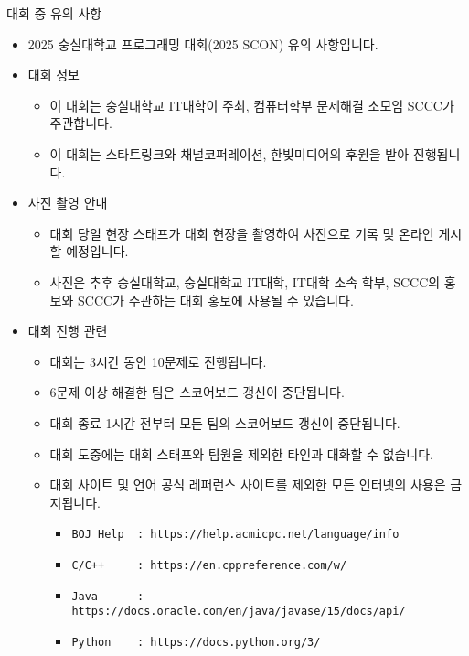 {
    \indent
    \Large
    
    대회 중 유의 사항
}

\begin{itemize}[noitemsep]
    \item 2025 숭실대학교 프로그래밍 대회(2025 SCON) 유의 사항입니다.
    
    \item 대회 정보
    
    \begin{itemize}[noitemsep]
        \item 이 대회는 숭실대학교 IT대학이 주최, 컴퓨터학부 문제해결 소모임 SCCC가 주관합니다.
        \item 이 대회는 스타트링크와 채널코퍼레이션, 한빛미디어의 후원을 받아 진행됩니다.
    \end{itemize}
    
    \item 사진 촬영 안내
    
    \begin{itemize}[noitemsep]
        \item 대회 당일 현장 스태프가 대회 현장을 촬영하여 사진으로 기록 및 온라인 게시할 예정입니다.
        \item 사진은 추후 숭실대학교, 숭실대학교 IT대학, IT대학 소속 학부, SCCC의 홍보와 SCCC가 주관하는 대회 홍보에 사용될 수 있습니다.
    \end{itemize}

    \item 대회 진행 관련

    \begin{itemize}[noitemsep]
        \item 대회는 3시간 동안 10문제로 진행됩니다.
        \item 6문제 이상 해결한 팀은 스코어보드 갱신이 중단됩니다.
        \item 대회 종료 1시간 전부터 모든 팀의 스코어보드 갱신이 중단됩니다.
        \item 대회 도중에는 대회 스태프와 팀원을 제외한 타인과 대화할 수 없습니다.
        \item 대회 사이트 및 언어 공식 레퍼런스 사이트를 제외한 모든 인터넷의 사용은 금지됩니다.

        \begin{itemize}[noitemsep]
            \item \texttt{BOJ Help \ : https://help.acmicpc.net/language/info}
            \item \texttt{C/C++ \ \ \ \ : https://en.cppreference.com/w/}
            \item \texttt{Java \ \ \ \ \ : https://docs.oracle.com/en/java/javase/15/docs/api/}
            \item \texttt{Python \ \ \ : https://docs.python.org/3/}
        \end{itemize}


\end{itemize}
\end{itemize}
